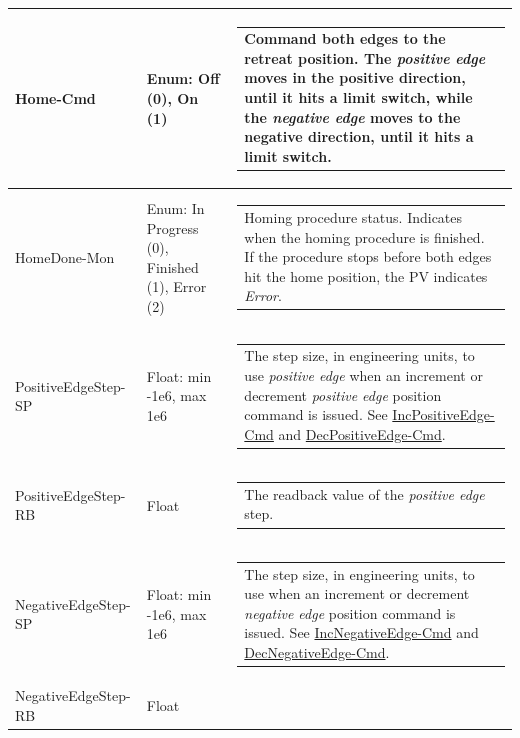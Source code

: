 \documentclass[openany]{article}
\begin{document}
\begin{longtable}{| m{4.5cm} m{2.5cm}  m{7.0cm} |}
        Home-Cmd & Enum: Off (0), On (1) & \begin{tabular}{@{}m{6cm}@{}}
                Command both edges to the retreat position. The \emph{positive edge} moves in the positive direction, until it hits a limit switch, while the \emph{negative edge} moves to the negative direction, until it hits a limit switch.
            \end{tabular} \hypertarget{pv:home-done-mon}{}\\ \hline
        HomeDone-Mon & Enum: In Progress (0), Finished (1), Error (2) & \begin{tabular}{@{}m{6cm}@{}}
                Homing procedure status. Indicates when the homing procedure is finished. If the procedure stops before both edges hit the home position, the PV indicates \emph{Error}.
            \end{tabular} \hypertarget{pv:positive-edge-step}{}\\ \hline
        PositiveEdgeStep-SP & Float: min -1e6, max 1e6 & \begin{tabular}{@{}m{6cm}@{}}
                The step size, in engineering units, to use \emph{positive edge} when an increment or decrement \emph{positive edge} position command is issued. See \hyperlink{pv:inc-positive-edge-cmd}{IncPositiveEdge-Cmd} and \hyperlink{pv:dec-positive-edge-cmd}{DecPositiveEdge-Cmd}.
            \end{tabular} \hypertarget{}{}\\ \hline
        PositiveEdgeStep-RB & Float & \begin{tabular}{@{}m{6cm}@{}}
                The readback value of the \emph{positive edge} step.
            \end{tabular} \hypertarget{pv:negative-edge-step}{}\\ \hline
        NegativeEdgeStep-SP & Float: min -1e6, max 1e6 & \begin{tabular}{@{}m{6cm}@{}}
                The step size, in engineering units, to use when an increment or decrement \emph{negative edge} position command is issued. See \hyperlink{pv:inc-negative-edge-cmd}{IncNegativeEdge-Cmd} and \hyperlink{pv:dec-negative-edge-cmd}{DecNegativeEdge-Cmd}.
            \end{tabular} \hypertarget{}{}\\ \hline
        NegativeEdgeStep-RB & Float & \begin{tabular}{@{}m{6cm}@{}}

\end{tabular}
\end{longtable}
\end{document}
